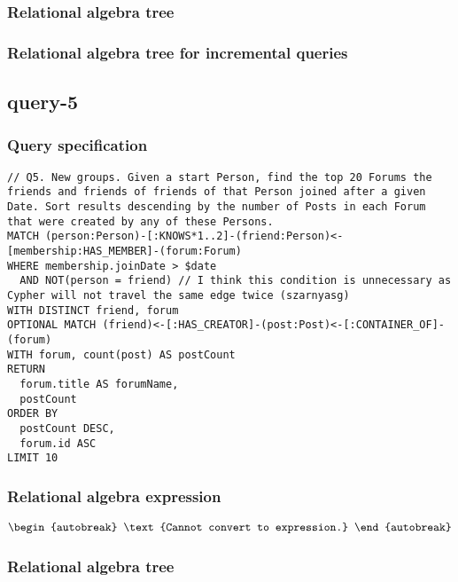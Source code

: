 \subsubsection*{Relational algebra tree}


\subsubsection*{Relational algebra tree for incremental queries}

\subsection{query-5}

\subsubsection*{Query specification}

\begin{lstlisting}
// Q5. New groups. Given a start Person, find the top 20 Forums the friends and friends of friends of that Person joined after a given Date. Sort results descending by the number of Posts in each Forum that were created by any of these Persons.
MATCH (person:Person)-[:KNOWS*1..2]-(friend:Person)<-[membership:HAS_MEMBER]-(forum:Forum)
WHERE membership.joinDate > $date
  AND NOT(person = friend) // I think this condition is unnecessary as Cypher will not travel the same edge twice (szarnyasg)
WITH DISTINCT friend, forum
OPTIONAL MATCH (friend)<-[:HAS_CREATOR]-(post:Post)<-[:CONTAINER_OF]-(forum)
WITH forum, count(post) AS postCount
RETURN
  forum.title AS forumName,
  postCount
ORDER BY
  postCount DESC,
  forum.id ASC
LIMIT 10
\end{lstlisting}

\subsubsection*{Relational algebra expression}

\begin{align*}
\begin{autobreak}
\text{Cannot convert to expression.}
\end{autobreak}
\end{align*}

\subsubsection*{Relational algebra tree}

